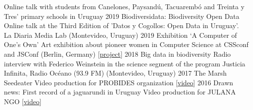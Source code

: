 \documentclass[9pt]{developercv} %
\begin{document}
\begin{entrylist}
		{}
		{Online talk with students from Canelones, Paysandú, Tacuarembó and Treinta y Tres' primary schools in Uruguay}
	\entrylong
		{2019}
		{Biodiversidata: Biodiversity Open Data}
		{}
		{Online talk at the Third Edition of 'Datos y Cogollos: Open Data in Uruguay'. La Diaria Media Lab (Montevideo, Uruguay)}
	\entrylong
		{2019}
		{Exhibition ‘A Computer of One’s Own’}
		{}
		{Art exhibition about pioneer women in Computer Science at CSSconf and JSConf (Berlin, Germany) [\href{https://medium.com/a-computer-of-ones-own}{project}]}
	\entrylong
		{2018}
		{Big data in biodiversity}
		{}
		{Radio interview with Federico Weinstein in the science segment of the program Justicia Infinita, Radio Océano (93.9 FM) (Montevideo, Uruguay)}
	\entrylong
		{2017}
		{The Marsh Seedeater}
		{}
		{Video production for PROBIDES organization [\href{https://youtu.be/EYKt83ShWQ8}{video}]}
	\entrylong
		{2016}
		{Drawn news: First record of a jaguarundi in Uruguay}
		{}
		{Video production for JULANA NGO [\href{https://youtu.be/Zva9m9hmXCc}{video}]}	
\end{entrylist}




%
%	
%	
%	
%	
%	
\end{document}
